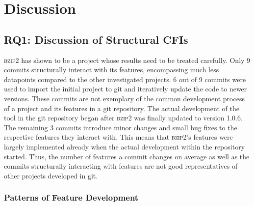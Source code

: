 \clearpage 

\section{Discussion}\label{sec:discussion}

\subsection*{\textbf{RQ1: Discussion of Structural CFIs}}\label{sec:eval_struc_cfis}

\textsc{bzip2} has shown to be a project whose results need to be treated carefully.
Only 9 commits structurally interact with its features, encompassing much less datapoints compared to the other investigated projects.
6 out of 9 commits were used to import the initial project to git and iteratively update the code to newer versions.
These commits are not exemplary of the common development process of a project and its features in a git repository.
The actual development of the tool in the git repository began after \textsc{bzip2} was finally updated to version 1.0.6.
The remaining 3 commits introduce minor changes and small bug fixes to the respective features they interact with.
This means that \textsc{bzip2}'s features were largely implemented already when the actual development within the repository started.
Thus, the number of features a commit changes on average as well as the commits structurally interacting with features are not good representatives of other projects developed in git.

\subsubsection*{Patterns of Feature Development}\label{sec:eval_feature_development}

